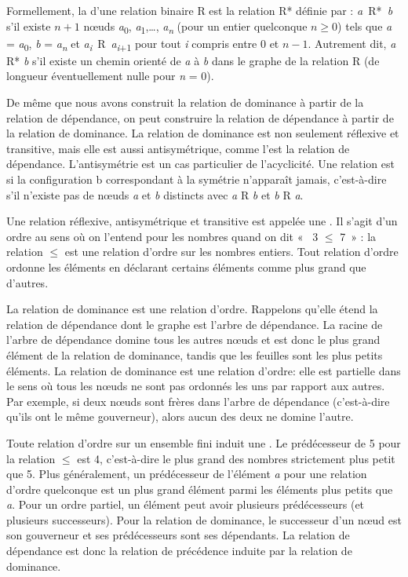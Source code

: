 {    Formellement, la  d’une relation binaire R est la relation R* définie par : \textit{a~}R*\textit{~b} s’il existe $n+1$ nœuds \textit{a}\textsubscript{0}, \textit{a}\textsubscript{1},…, \textit{a\textsubscript{n}} (pour un entier quelconque $n \geq 0$) tels que \textit{a} = \textit{a}\textsubscript{0}, \textit{b} = \textit{a\textsubscript{n}} et \textit{a\textsubscript{i}}~R~\textit{a\textsubscript{i}}\textsubscript{+1} pour tout \textit{i} compris entre 0 et $n-1$. Autrement dit, \textit{a} R* \textit{b} s’il existe un chemin orienté de \textit{a} à \textit{b} dans le graphe de la relation R (de longueur éventuellement nulle pour \textit{n} = 0).

    De même que nous avons construit la relation de dominance à partir de la relation de dépendance, on peut construire la relation de dépendance à partir de la relation de dominance. La relation de dominance est non seulement réflexive et transitive, mais elle est aussi antisymétrique, comme l’est la relation de dépendance. L’antisymétrie est un cas particulier de l’acyclicité. Une relation est  si la configuration b correspondant à la symétrie n’apparaît jamais, c’est-à-dire s’il n’existe pas de nœuds \textit{a} et \textit{b} distincts avec \textit{a} R \textit{b} et \textit{b} R \textit{a}.

    Une relation réflexive, antisymétrique et transitive est appelée une . Il s’agit d’un ordre au sens où on l’entend pour les nombres quand on dit «~ 3 ${\leq}$ 7~» : la relation ${\leq}$ est une relation d’ordre sur les nombres entiers. Tout relation d’ordre ordonne les éléments en déclarant certains éléments comme plus grand que d’autres.

    La relation de dominance est une relation d’ordre. Rappelons qu’elle étend la relation de dépendance dont le graphe est l’arbre de dépendance. La racine de l'arbre de dépendance domine tous les autres nœuds et est donc le plus grand élément de la relation de dominance, tandis que les feuilles sont les plus petits éléments. La relation de dominance est une relation d’ordre: elle est partielle dans le sens où tous les nœuds ne sont pas ordonnés les uns par rapport aux autres. Par exemple, si deux nœuds sont frères dans l’arbre de dépendance (c’est-à-dire qu’ils ont le même gouverneur), alors aucun des deux ne domine l’autre.

    Toute relation d’ordre sur un ensemble fini induit une . Le prédécesseur de 5 pour la relation ${\leq}$ est 4, c’est-à-dire le plus grand des nombres strictement plus petit que 5. Plus généralement, un prédécesseur de l’élément \textit{a} pour une relation d’ordre quelconque est un plus grand élément parmi les éléments plus petits que \textit{a}. Pour un ordre partiel, un élément peut avoir plusieurs prédécesseurs (et plusieurs successeurs). Pour la relation de dominance, le successeur d’un nœud est son gouverneur et ses prédécesseurs sont ses dépendants. La relation de dépendance est donc la relation de précédence induite par la relation de dominance.

}
